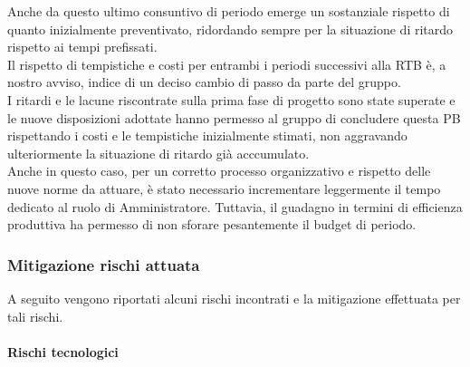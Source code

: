 Anche da questo ultimo consuntivo di periodo emerge un sostanziale rispetto di quanto inizialmente preventivato, ridordando sempre per la situazione di ritardo rispetto ai tempi  prefissati. \\
Il rispetto di tempistiche e costi per entrambi i periodi successivi alla RTB è, a nostro avviso, indice di un deciso cambio di passo da parte del gruppo. \\
I ritardi e le lacune riscontrate sulla prima fase di progetto sono state superate e le nuove disposizioni adottate hanno permesso al gruppo di concludere questa PB rispettando i costi e le tempistiche inizialmente stimati, non aggravando ulteriormente la situazione di ritardo già acccumulato.\\
Anche in questo caso, per un corretto processo organizzativo e rispetto delle nuove norme da attuare, è stato necessario incrementare leggermente il tempo dedicato al ruolo di Amministratore. Tuttavia, il guadagno in termini di efficienza produttiva ha permesso di non sforare pesantemente il budget di periodo. 


\subsubsection{Mitigazione rischi attuata}\label{sec:consuntivo:analisi:mitigazione}

A seguito vengono riportati alcuni rischi incontrati e la mitigazione effettuata per tali rischi.\\



\paragraph{Rischi tecnologici}

